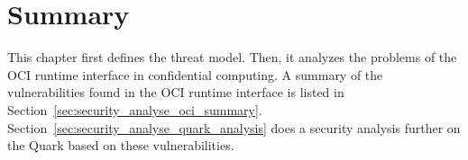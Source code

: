 



\section{Summary}
\label{sec:security_summarize}

This chapter first defines the threat model. Then, it analyzes the problems of the OCI runtime interface in confidential computing. A summary of the vulnerabilities found in the OCI runtime interface is listed in Section~\ref{sec:security_analyse_oci_summary}. Section~\ref{sec:security_analyse_quark_analysis} does a security analysis further on the Quark 
based on these vulnerabilities.
 
